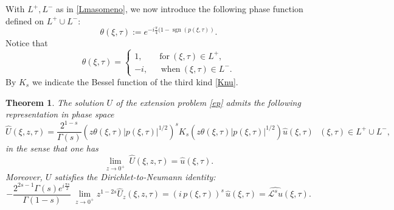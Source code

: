 \documentclass[11pt,letter]{amsart}
\def \G{\Gamma}
\numberwithin{equation}{section}
\newcommand{\Le}{\mathcal L}
\newtheorem{theorem}{Theorem}[section]
\numberwithin{equation}{section}
\begin{document}
With $L^+, L^-$ as in \eqref{Lmasomeno}, we now introduce the following phase function defined on $L^+\cup L^-$:
\begin{equation}\label{phase}
\theta(\xi,\tau) := e^{-i \frac{\pi}4(1-\operatorname{sgn}(p(\xi,\tau))}.
\end{equation}
Notice that 
\[
\theta(\xi,\tau) = \begin{cases}
1,\ \ \ \ \ \ \ \ \ \text{for}\ (\xi,\tau)\in L^+,
\\
-i,\ \ \ \ \ \ \  \text{when}\ (\xi,\tau)\in L^-.
\end{cases}
\]
By
$K_s$ we indicate the Bessel function of the third kind \eqref{Knu}.




\begin{theorem}\label{T:itstheFT}
The solution $U$ of the extension problem \eqref{ep} admits the following representation in phase space
\begin{equation}\label{supernicehatV0}
\widehat U(\xi,z,\tau)  = \frac{2^{1-s}}{ \G(s)} \left(z \theta(\xi,\tau)  |p(\xi,\tau)|^{1/2}\right)^s K_{s}\left(z \theta(\xi,\tau)  |p(\xi,\tau)|^{1/2}\right) \hat u(\xi,\tau)\ \ \ (\xi,\tau)\in L^+\cup L^-, 
\end{equation}
in the sense that one has
\begin{equation}\label{pointwise}
\underset{z\to 0^+}{\lim}\ \widehat U(\xi,z,\tau) = \widehat u(\xi,\tau).
\end{equation}
Moreover, $U$ satisfies the Dirichlet-to-Neumann identity:
\begin{equation}\label{onL+0}
- \frac{2^{2s-1} \G(s)e^{i\frac{\pi s}2} }{\G(1-s)}\ \underset{z\to 0^+}{\lim} z^{1-2s} \widehat U_z(\xi,z,\tau) = (i\,p(\xi,\tau))^s\,\widehat u(\xi,\tau) = \widehat{\Le^s u}(\xi,\tau). 
\end{equation}
\end{theorem}
\end{document}
